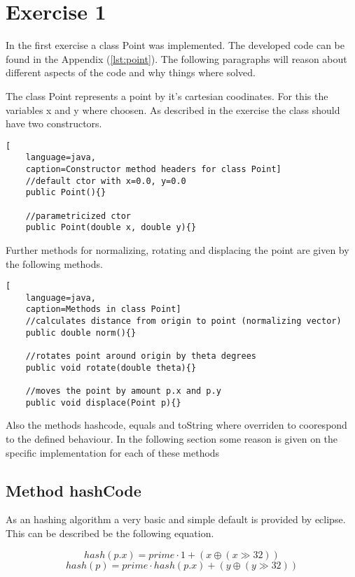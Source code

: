 \chapter{Exercise 1}

In the first exercise a class Point was implemented. The developed code can be found in the Appendix (\ref{lst:point}). The following paragraphs will reason about different aspects of the code and why things where solved.

The class Point represents a point by it's cartesian coodinates. For this the variables x and y where choosen. As described in the exercise the class should have two constructors.

\begin{lstlisting}[
    language=java,
    caption=Constructor method headers for class Point]
    //default ctor with x=0.0, y=0.0
    public Point(){}

    //parametricized ctor
    public Point(double x, double y){}
\end{lstlisting}

Further methods for normalizing, rotating and displacing the point are given by the following methods.

\begin{lstlisting}[
    language=java,
    caption=Methods in class Point]
    //calculates distance from origin to point (normalizing vector)
    public double norm(){}

    //rotates point around origin by theta degrees
    public void rotate(double theta){}

    //moves the point by amount p.x and p.y
    public void displace(Point p){}
\end{lstlisting}

Also the methods hashcode, equals and toString where overriden to coorespond to the defined behaviour. In the following section some reason is given on the specific implementation for each of these methods

\section{Method hashCode}
As an hashing algorithm a very basic and simple default is provided by eclipse. This can be described be the following equation.

\begin{displaymath}
    hash(p.x) = prime \cdot 1 + (x \oplus (x \gg 32))
\end{displaymath}
\begin{displaymath}
    hash(p) = prime \cdot hash(p.x) + (y \oplus (y \gg 32))
\end{displaymath}

